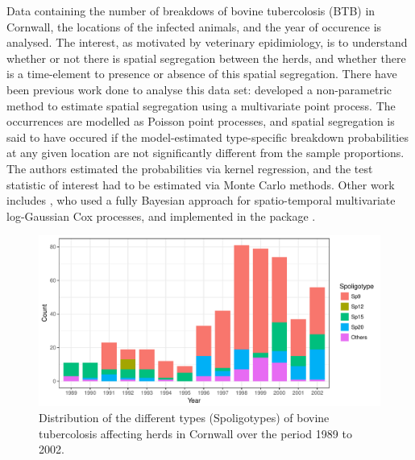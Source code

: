 \documentclass[a4paper,showframe,11pt]{report}\usepackage[]{graphicx}\usepackage[]{color}
\newenvironment{knitrout}{}{} %
\begin{document}
Data containing the number of breakdows of bovine tubercolosis (BTB) in Cornwall, the locations of the infected animals, and the year of occurence is analysed.
The interest, as motivated by veterinary epidimiology, is to understand whether or not there is spatial segregation between the herds, and whether there is a time-element to presence or absence of this spatial segregation.
There have been previous work done to analyse this data set: \citet{diggle2005nonparametric} developed a non-parametric method to estimate spatial segregation using a multivariate point process.
The occurrences are modelled as Poisson point processes, and spatial segregation is said to have occured if the model-estimated type-specific breakdown probabilities at any given location are not significantly different from the sample proportions.
The authors estimated the probabilities via kernel regression, and the test statistic of interest had to be estimated via Monte Carlo methods.
Other work includes \citet{diggle2013spatial}, who used a fully Bayesian approach for spatio-temporal multivariate log-Gaussian Cox processes, and implemented in the  package  \citep{taylor2013lgcp}.

\begin{knitrout}
\color{fgcolor}\begin{figure}[htb]

{\centering \includegraphics[width=\linewidth]{figure/05-plot_cow-1} 

}

\caption[Distribution of the different types (Spoligotypes) of bovine tubercolosis affecting herds in Cornwall over the period 1989 to 2002]{Distribution of the different types (Spoligotypes) of bovine tubercolosis affecting herds in Cornwall over the period 1989 to 2002.}\label{fig:plot.cow}
\end{figure}


\end{knitrout}
\end{document}
